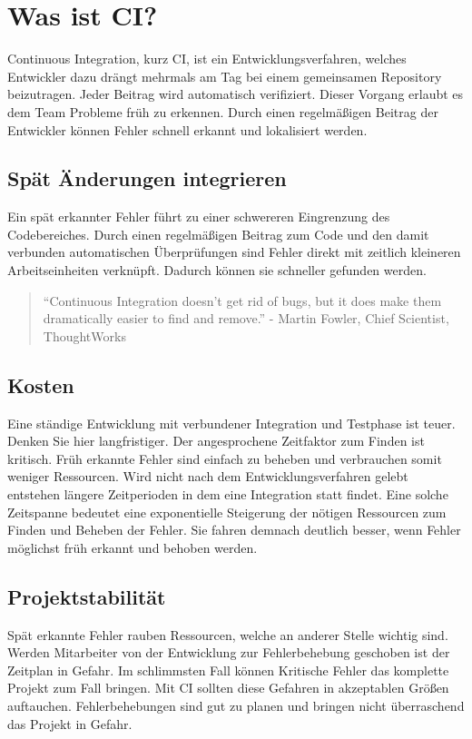 \chapter{Was ist CI?}
Continuous Integration, kurz CI, ist ein Entwicklungsverfahren, welches Entwickler dazu drängt mehrmals am Tag bei einem gemeinsamen Repository beizutragen. Jeder Beitrag wird automatisch verifiziert. Dieser Vorgang erlaubt es dem Team Probleme früh zu erkennen.
Durch einen regelmäßigen Beitrag der Entwickler können Fehler schnell erkannt und lokalisiert werden.

\section{Spät Änderungen integrieren}
Ein spät erkannter Fehler führt zu einer schwereren Eingrenzung des Codebereiches. Durch einen regelmäßigen Beitrag zum Code und den damit verbunden automatischen Überprüfungen sind Fehler direkt mit zeitlich kleineren Arbeitseinheiten verknüpft. Dadurch können sie schneller gefunden werden.

\begin{quote}
“Continuous Integration doesn’t get rid of bugs, but it does make them dramatically easier to find and remove.” - Martin Fowler, Chief Scientist, ThoughtWorks \cite{continuous-integration-thoughtworks}
\end{quote}

\section{Kosten}
Eine ständige Entwicklung mit verbundener Integration und Testphase ist teuer. Denken Sie hier langfristiger. Der angesprochene Zeitfaktor zum Finden ist kritisch. Früh erkannte Fehler sind einfach zu beheben und verbrauchen somit weniger Ressourcen. Wird nicht nach dem Entwicklungsverfahren gelebt entstehen längere Zeitperioden in dem eine Integration statt findet. Eine solche Zeitspanne bedeutet eine exponentielle Steigerung der nötigen Ressourcen zum Finden und Beheben der Fehler. Sie fahren demnach deutlich besser, wenn Fehler möglichst früh erkannt und behoben werden.

\section{Projektstabilität}
Spät erkannte Fehler rauben Ressourcen, welche an anderer Stelle wichtig sind. Werden Mitarbeiter von der Entwicklung zur Fehlerbehebung geschoben ist der Zeitplan in Gefahr. Im schlimmsten Fall können Kritische Fehler das komplette Projekt zum Fall bringen. Mit CI sollten diese Gefahren in akzeptablen Größen auftauchen. Fehlerbehebungen sind gut zu planen und bringen nicht überraschend das Projekt in Gefahr. 

